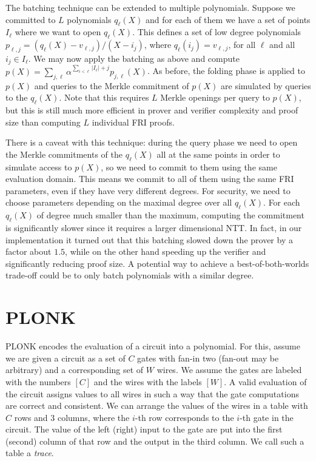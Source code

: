 \documentclass[final]{zamarep}
\newcommand{\abs}[1]{\lvert #1 \rvert}
\begin{document}
The batching technique can be extended to multiple polynomials. Suppose we committed to $L$ polynomials $q_\ell(X)$ and for each of them we have a set of points $I_\ell$ where we want to open $q_\ell(X)$. This defines a set of low degree polynomials $p_{\ell, j} = (q_\ell(X) - v_{\ell, j})/(X - i_j)$, where $q_\ell(i_j) = v_{\ell, j} $, for all $\ell$ and all $i_j \in I_\ell$. We may now apply the batching as above and compute $p(X) = \sum_{j, \ell} \alpha^{\sum_{i < \ell} \abs{I_\ell} + j} p_{j, \ell}(X)$. As before, the folding phase is applied to $p(X)$ and queries to the Merkle commitment of $p(X)$ are simulated by queries to the $q_\ell(X)$. Note that this requires $L$ Merkle openings per query to $p(X)$, but this is still much more efficient in prover and verifier complexity and proof size than computing $L$ individual FRI proofs.

There is a caveat with this technique: during the query phase we need to open the Merkle commitments of the $q_\ell(X)$ all at the same points in order to simulate access to $p(X)$, so we need to commit to them using the same evaluation domain. This means we commit to all of them using the same FRI parameters, even if they have very different degrees. For security, we need to choose parameters depending on the maximal degree over all $q_\ell(X)$. For each $q_\ell(X)$ of degree much smaller than the maximum, computing the commitment is significantly slower since it requires a larger dimensional NTT. In fact, in our implementation it turned out that this batching slowed down the prover by a factor about $1.5$, while on the other hand speeding up the verifier and significantly reducing proof size. A potential way to achieve a best-of-both-worlds trade-off could be to only batch polynomials with a similar degree. 

\section{PLONK}
\label{sec:plonk}
PLONK encodes the evaluation of a circuit into a polynomial. For this, assume we are given a circuit as a set of $C$ gates with fan-in two (fan-out may be arbitrary) and a corresponding set of $W$ wires. We assume the gates are labeled with the numbers $[C]$ and the wires with the labels $[W]$. A valid evaluation of the circuit assigns values to all wires in such a way that the gate computations are correct and consistent. We can arrange the values of the wires in a table with $C$ rows and 3 columns, where the $i$-th row corresponds to the $i$-th gate in the circuit. The value of the left (right) input to the gate are put into the first (second) column of that row and the output in the third column. We call such a table a \emph{trace}.
\end{document}
